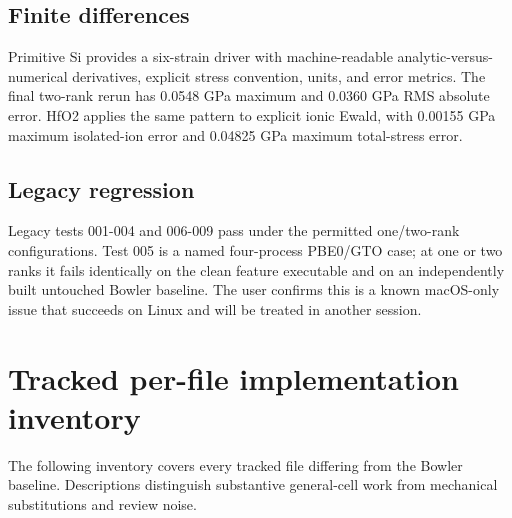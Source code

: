 \documentclass[10pt,a4paper]{report}
\begin{document}
\section{Finite differences}
Primitive Si provides a six-strain driver with machine-readable analytic-versus-numerical derivatives, explicit stress convention, units, and error metrics. The final two-rank rerun has 0.0548 GPa maximum and 0.0360 GPa RMS absolute error. HfO2 applies the same pattern to explicit ionic Ewald, with 0.00155 GPa maximum isolated-ion error and 0.04825 GPa maximum total-stress error.

\section{Legacy regression}
Legacy tests 001-004 and 006-009 pass under the permitted one/two-rank configurations. Test 005 is a named four-process PBE0/GTO case; at one or two ranks it fails identically on the clean feature executable and on an independently built untouched Bowler baseline. The user confirms this is a known macOS-only issue that succeeds on Linux and will be treated in another session.

\chapter{Tracked per-file implementation inventory}
The following inventory covers every tracked file differing from the Bowler baseline. Descriptions distinguish substantive general-cell work from mechanical substitutions and review noise.
\end{document}
